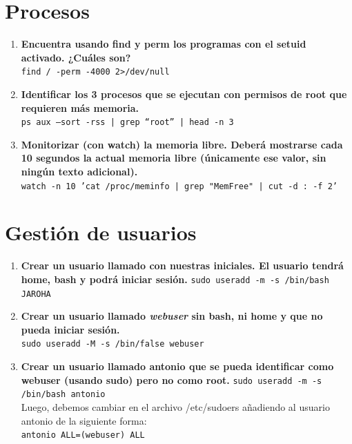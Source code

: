 \documentclass[12pt,letterpaper]{article}
\begin{document}
\section{Procesos}
\begin{enumerate}
	\item \textbf{Encuentra usando find y perm los programas con el setuid activado. ¿Cuáles son?} \\ 
	\texttt{find / -perm -4000 2>/dev/null}
	\item \textbf{Identificar los 3 procesos que se ejecutan con permisos de root que requieren más memoria.} \\
	\texttt{ps aux --sort -rss | grep ``root'' | head -n 3}
	\item \textbf{Monitorizar (con watch) la memoria libre. Deberá mostrarse cada 10 segundos la actual memoria libre (únicamente ese valor, sin ningún texto adicional).} \\
	\texttt{watch -n 10 'cat /proc/meminfo | grep "MemFree" | cut -d : -f 2'}
\end{enumerate}

\section{Gestión de usuarios}
\begin{enumerate}
	\item \textbf{Crear un usuario llamado con nuestras iniciales. El usuario tendrá home, bash y podrá iniciar sesión.}
	\texttt{sudo useradd -m -s /bin/bash JAROHA}
	\item \textbf{Crear un usuario llamado \textit{webuser} sin bash, ni home y que no pueda iniciar sesión.} \\
	\texttt{sudo useradd -M -s /bin/false webuser}
	\item \textbf{Crear un usuario llamado antonio que se pueda identificar como webuser (usando sudo) pero no como root.}
	\texttt{sudo useradd -m -s /bin/bash antonio} \\
	Luego, debemos cambiar en el archivo /etc/sudoers añadiendo al usuario antonio de la siguiente forma: \\
	\texttt{antonio ALL=(webuser) ALL}
\end{enumerate}
\end{document}
